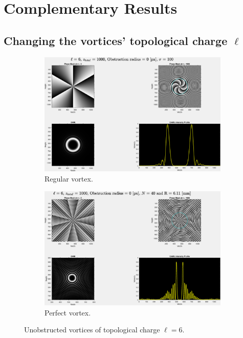 \chapter{Complementary Results}
\label{Complementary_Results}

\section{Changing the vortices' topological charge $\ell$}

\begin{figure}[htbp]
    \centering
    \begin{subfigure}[b]{0.45\textwidth}
        \centering
        \includegraphics[width=\textwidth]{images/Appendices/Additional_Results/Topological_Charge/type=0_r=0_zi=0_zf=1000.eps}
        \caption{Regular vortex.}
    \end{subfigure}
    \hfill
    \begin{subfigure}[b]{0.45\textwidth}
        \centering
        \includegraphics[width=\textwidth]{images/Appendices/Additional_Results/Topological_Charge/type=1_r=0_zi=0_zf=1000.eps}
        \caption{Perfect vortex.}
    \end{subfigure}
    \caption{Unobstructed vortices of topological charge $\ell = 6$.}
    \label{fig:L=6_r=0}
\end{figure}

